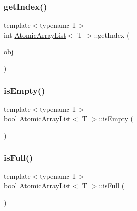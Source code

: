 \mbox{\label{classAtomicArrayList_a5ec8d715f9d33bb1a997cd8b2d71abb7}} 
\subsubsection{\texorpdfstring{get\+Index()}{getIndex()}}
{\footnotesize\ttfamily template$<$typename T$>$ \\
int \hyperlink{classAtomicArrayList}{Atomic\+Array\+List}$<$ T $>$\+::get\+Index (\begin{DoxyParamCaption}\item[{T $\ast$const}]{obj }\end{DoxyParamCaption})\hspace{0.3cm}{\ttfamily [inline]}}

\mbox{\label{classAtomicArrayList_aa783ae1f37a2ce221e7309dc482770ad}} 
\subsubsection{\texorpdfstring{is\+Empty()}{isEmpty()}}
{\footnotesize\ttfamily template$<$typename T$>$ \\
bool \hyperlink{classAtomicArrayList}{Atomic\+Array\+List}$<$ T $>$\+::is\+Empty (\begin{DoxyParamCaption}{ }\end{DoxyParamCaption})\hspace{0.3cm}{\ttfamily [inline]}}

\mbox{\label{classAtomicArrayList_a12841c46537a754e9fd5b4cbd32c3d68}} 
\subsubsection{\texorpdfstring{is\+Full()}{isFull()}}
{\footnotesize\ttfamily template$<$typename T$>$ \\
bool \hyperlink{classAtomicArrayList}{Atomic\+Array\+List}$<$ T $>$\+::is\+Full (\begin{DoxyParamCaption}{ }\end{DoxyParamCaption})\hspace{0.3cm}{\ttfamily [inline]}}

